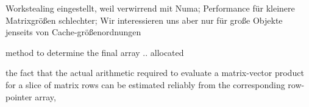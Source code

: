     Workstealing eingestellt, weil verwirrend mit Numa; Performance für kleinere Matrixgrößen schlechter; Wir
    interessieren uns aber nur für große Objekte jenseits von Cache-größenordnungen

    method to determine the final array .. allocated 

    the fact that the actual arithmetic required to evaluate a matrix-vector product for a
    slice of matrix rows can be estimated reliably from the corresponding row-pointer array,


